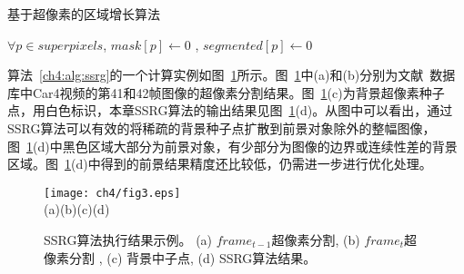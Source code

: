 \renewcommand{\algorithmcfname}{算法}
\begin{algorithm}
\caption{基于超像素的区域增长算法}
\label{ch4:alg:ssrg}
\LinesNumbered
{}
 $\forall p \in superpixels$, $mask[p] \leftarrow 0$ , $segmented[p] \leftarrow 0$ \;

\end{algorithm}

算法~\ref{ch4:alg:ssrg}的一个计算实例如图~\ref{ch4:fig:3}所示。图~\ref{ch4:fig:3}中(a)和(b)分别为文献~数据库中Car4视频的第41和42帧图像的超像素分割结果。图~\ref{ch4:fig:3}(c)为背景超像素种子点，用白色标识，本章SSRG算法的输出结果见图~\ref{ch4:fig:3}(d)。从图中可以看出，通过SSRG算法可以有效的将稀疏的背景种子点扩散到前景对象除外的整幅图像，图~\ref{ch4:fig:3}(d)中黑色区域大部分为前景对象，有少部分为图像的边界或连续性差的背景区域。图~\ref{ch4:fig:3}(d)中得到的前景结果精度还比较低，仍需进一步进行优化处理。
\begin{figure}[!htbp]
\begin{center}
\texttt{[image: ch4/fig3.eps]}\\
  (a)\quad\quad\quad\quad\quad\quad\quad\quad(b)\quad\quad\quad\quad\quad\quad\quad\quad(c)\quad\quad\quad\quad\quad\quad\quad\quad(d)
\end{center}

\caption{SSRG算法执行结果示例。 (a) $frame_{t-1}$超像素分割, (b) $frame_{t}$超像素分割 , (c) 背景中子点, (d) SSRG算法结果。}
\label{ch4:fig:3}       %
\end{figure}


